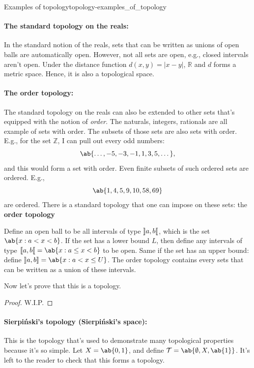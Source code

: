 \begin{exmp}{Examples of topology}{topology-examples_of_topology}
  \paragraph{The standard topology on the reals:}

  In the standard notion of the reals, sets that can be written as unions of open
  balls are automatically open. However, not all sets are open, e.g., closed intervals
  aren't open. Under the distance function \(d(x, y) = |x - y|\), \(\mathbb{R}\) and
  \(d\) forms a metric space. Hence, it is also a topological space.

  \paragraph{The order topology:}

  The standard topology on the reals can also be extended to other sets that's equipped
  with the notion of \emph{order}. The naturals, integers, rationals are all example of sets
  with order. The subsets of those sets are also sets with order. E.g., for the set \(\mathbb{Z}\),
  I can pull out every odd numbers: 
  \begin{equation}
    \ab\{\dots, -5, -3, -1, 1, 3, 5, \dots\},
  \end{equation}
  and this would form a set with order. Even finite subsets of such ordered sets are ordered. E.g.,
  \begin{equation}
    \ab\{1, 4, 5, 9, 10, 58, 69\}
  \end{equation}
  are ordered. There is a standard topology that one can impose on these sets: the
  \textbf{order topology}

  Define an open ball to be all intervals of type \(\ointv{a, b}\), which is the set
  \(\ab\{x : a < x < b\}\). If the set has a lower bound \(L\), then define any intervals of type
  \(\cointv{a, b} = \ab\{x : a \leq x < b\}\) to be open. Same if the set has an upper
  bound: define \(\ocintv{a, b} = \ab\{x : a < x \leq U\}\). The order topology contains
  every sets that can be written as a union of these intervals.

  Now let's prove that this is a topology.

  \begin{proof}
    {\color{red} W.I.P.}
  \end{proof}

  \paragraph{Sierpi\'nski's topology (Sierpi\'nski's space):}

  This is the topology that's used to demonstrate many topological properties because it's
  so simple. Let \(X = \ab\{0, 1\}\), and define \(\mathcal{T} = \ab\{\emptyset, X, \ab\{1\}\}\).
  It's left to the reader to check that this forms a topology.
\end{exmp}

